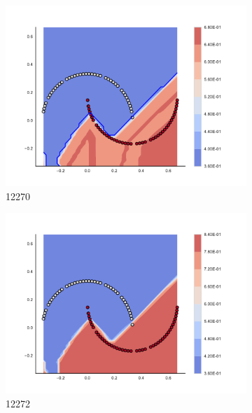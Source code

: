 \begin{figure}[h]
\begin{subfigure}[b]{0.09\textwidth}
    \includegraphics[clip, trim=2.35cm 1.75cm 4.5cm 0cm,width=\textwidth]{img/convergence/12270.pdf}
    \caption{12270}
    \label{fig:convergence_12270}
\end{subfigure}
%
\begin{subfigure}[b]{0.09\textwidth}
    \includegraphics[clip, trim=2.35cm 1.75cm 4.5cm 0cm,width=\textwidth]{img/convergence/12272.pdf}
    \caption{12272}
    \label{fig:convergence_12272}
\end{subfigure}
%
\begin{subfigure}[b]{0.09\textwidth}

\end{subfigure}
\end{figure}
